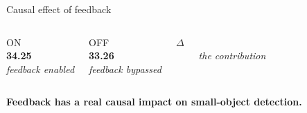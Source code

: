 \documentclass[aspectratio=169,11pt]{beamer}
\begin{document}
\begin{frame}{Causal effect of feedback}
    \vspace{0.5em}
    \begin{columns}[c, onlytextwidth]
        \centering
        {\large\color{Light}ON}\\[0.3em]
        {\fontsize{40}{40}\selectfont\bfseries\color{GoodGreen}34.25}\\[0.5em]
        {\itshape\small\color{Light}feedback enabled}

        \centering
        {\large\color{Light}OFF}\\[0.3em]
        {\fontsize{40}{40}\selectfont\bfseries\color{Light}33.26}\\[0.5em]
        {\itshape\small\color{Light}feedback bypassed}

        \centering
        {\large\color{Light}$\Delta$}\\[0.3em]
        \\[0.5em]
        {\itshape\small\color{Light}the contribution}
    \end{columns}

    \vspace{1.5em}
    \begin{center}
    \textbf{\color{Navy}Feedback has a real causal impact on small-object detection.}
    \end{center}
\end{frame}
\end{document}

